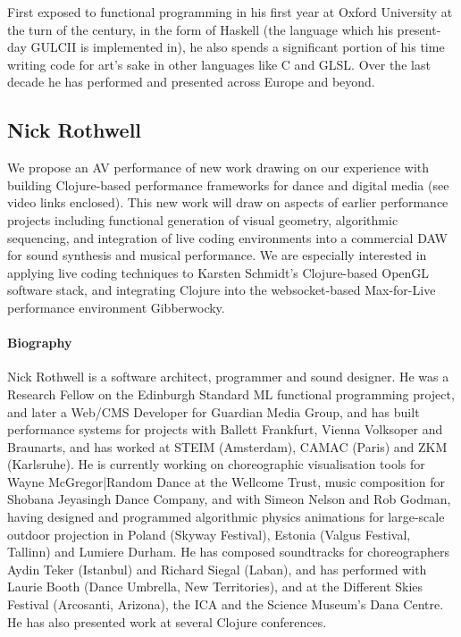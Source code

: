 \documentclass[sigplan,10pt,review]{acmart}\settopmatter{printfolios=true}
\begin{document}
First exposed to functional programming in his first year at Oxford University
at the turn of the century, in the form of Haskell (the language which his
present-day GULCII is implemented in), he also spends a significant portion of
his time writing code for art's sake in other languages like C and GLSL.  Over
the last decade he has performed and presented across Europe and beyond.

\subsection{Nick Rothwell}

We propose an AV performance of new work drawing on our experience
with building Clojure-based performance frameworks for dance and
digital media (see video links enclosed). This new work will draw on
aspects of earlier performance projects including functional
generation of visual geometry, algorithmic sequencing, and integration
of live coding environments into a commercial DAW for sound synthesis
and musical performance. We are especially interested in applying live
coding techniques to Karsten Schmidt's Clojure-based OpenGL software
stack, and integrating Clojure into the websocket-based Max-for-Live
performance environment Gibberwocky.


\paragraph{Biography} Nick Rothwell is a software architect, programmer and sound
designer. He was a Research Fellow on the Edinburgh Standard ML
functional programming project, and later a Web/CMS Developer for
Guardian Media Group, and has built performance systems for projects
with Ballett Frankfurt, Vienna Volksoper and Braunarts, and has worked
at STEIM (Amsterdam), CAMAC (Paris) and ZKM (Karlsruhe).  He is
currently working on choreographic visualisation tools for Wayne
McGregor|Random Dance at the Wellcome Trust, music composition for
Shobana Jeyasingh Dance Company, and with Simeon Nelson and Rob
Godman, having designed and programmed algorithmic physics animations
for large-scale outdoor projection in Poland (Skyway Festival),
Estonia (Valgus Festival, Tallinn) and Lumiere Durham.  He has
composed soundtracks for choreographers Aydin Teker (Istanbul) and
Richard Siegal (Laban), and has performed with Laurie Booth (Dance
Umbrella, New Territories), and at the Different Skies Festival
(Arcosanti, Arizona), the ICA and the Science Museum’s Dana Centre. He
has also presented work at several Clojure conferences.
\end{document}
